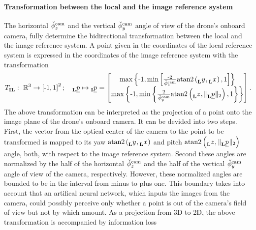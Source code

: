 \paragraph*{Transformation between the local and the image reference system} $\ $\\
The horizontal
$\ang[\user]{\camera}{z}{}{}$
and the vertical
$\ang[\user]{\camera}{y}{}{}$
angle of view
of the drone's onboard camera,
fully determine the bidirectional transformation 
between the local and the image reference system.
A point given in the coordinates of the local reference system
is expressed in the coordinates of the image reference system with the transformation
\begin{align} \label{equ:local_to_image_transformation}
    \trafo[]{}{\irs\lrs}{}{}
    :\ 
    \mathbb{R}^3 \rightarrow \left[ \text{-}1, 1 \right]^2
    ; \quad
    \pos[]{}{}{\lrs}{} \mapsto \pos[]{}{}{\irs}{}
    =
    \begin{bmatrix}
        \max \left\{ \text -1, \min \left[
            \frac{\text -2}{\ang[\user]{\camera}{z}{}{}}
            \mathrm{atan2}\left( \y[]{}{}{\lrs}{}, \x[]{}{}{\lrs}{} \right), 
            1
        \right] \right\} 
        \\
        \max \left\{ \text -1, \min \left\{
            \frac{2}{\ang[\user]{\camera}{y}{}{}}
            \mathrm{atan2} \left( \z[]{}{}{\lrs}{}, \| \pos[]{}{}{\lrs}{} \|_2 \right), 
            1
        \right\} \right\}
    \end{bmatrix}
    .
\end{align}
The above transformation
can be interpreted as the projection of a point onto the image plane 
of the drone's onboard camera.
It can be devided into two steps.
First, the vector from the optical center of the camera 
to the point to be transformed
is mapped to its yaw
$\mathrm{atan2}\left( \y[]{}{}{\lrs}{}, \x[]{}{}{\lrs}{} \right)$
and pitch 
$\mathrm{atan2} \left( \z[]{}{}{\lrs}{}, \| \pos[]{}{}{\lrs}{} \|_2 \right)$
angle, both, with respect to the image reference system.
Second these angles are normalized by 
the half of the horizontal 
$\ang[\user]{\camera}{z}{}{}$ 
and the half of the vertical
$\ang[\user]{\camera}{y}{}{}$
angle of view of the camera, respectively.
However, these normalized angles are bounded to be in the interval from minus to plus one.
This boundary takes into account that an
artifical neural network,
which inputs the images from the camera, 
could possibly perceive only whether a point is
out of the camera's field of view
but not by which amount.
As a projection from 3D to 2D, the above transformation is accompanied by information loss
